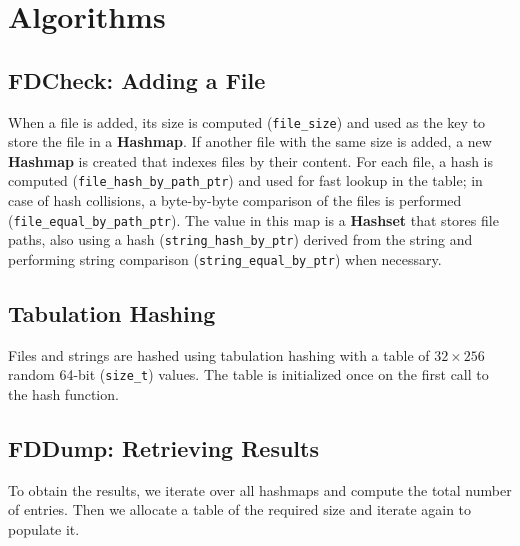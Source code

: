 \section{Algorithms}

\subsection{FDCheck: Adding a File}

When a file is added, its size is computed (\texttt{file\_size}) and used as the key to store the file in a \textbf{Hashmap}.
If another file with the same size is added, a new \textbf{Hashmap} is created that indexes files by their content.
For each file, a hash is computed (\texttt{file\_hash\_by\_path\_ptr}) and used for fast lookup in the table;
in case of hash collisions, a byte-by-byte comparison of the files is performed (\texttt{file\_equal\_by\_path\_ptr}).
The value in this map is a \textbf{Hashset} that stores file paths,
also using a hash (\texttt{string\_hash\_by\_ptr}) derived from the string
and performing string comparison (\texttt{string\_equal\_by\_ptr}) when necessary.


\subsection{Tabulation Hashing}

Files and strings are hashed using tabulation hashing with a table of $32 \times 256$ random 64-bit (\texttt{size\_t}) values.
The table is initialized once on the first call to the hash function.

\subsection{FDDump: Retrieving Results}

To obtain the results, we iterate over all hashmaps and compute the total number of entries.
Then we allocate a table of the required size and iterate again to populate it.
